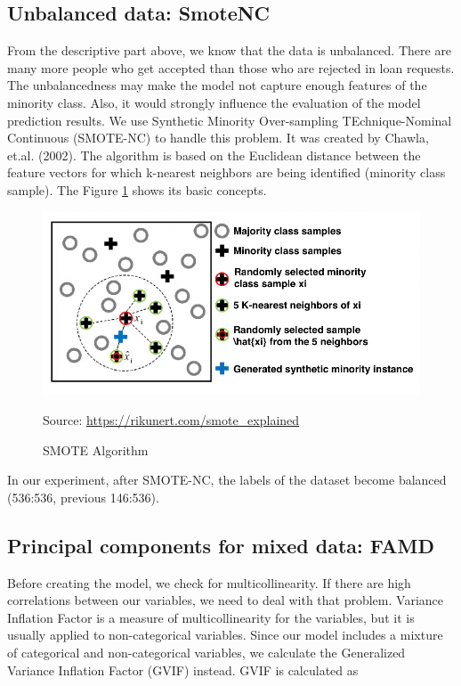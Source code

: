 \documentclass{jpp}
\begin{document}
\subsection{Unbalanced data: SmoteNC}

From the descriptive part above, we know that the data is unbalanced. There are many more people who get accepted than those who are rejected in loan requests. The unbalancedness may make the model not capture enough features of the minority class. Also, it would strongly influence the evaluation of the model prediction results. We use Synthetic Minority Over-sampling TEchnique-Nominal Continuous (SMOTE-NC) to handle this problem. It was created by Chawla, et.al. (2002). The algorithm is based on the Euclidean distance between the feature vectors for which k-nearest neighbors are being identified (minority class sample). The Figure \ref{smote} shows its basic concepts. 

\begin{figure}
  \centering
  \includegraphics[width=.9\linewidth]{smote.png}
    \caption*{Source: \url{https://rikunert.com/smote\_explained}
    }
  \caption{SMOTE Algorithm}
  \label{smote}
\end{figure}

In our experiment, after SMOTE-NC, the labels of the dataset become balanced (536:536, previous 146:536). 

\subsection{Principal components for mixed data: FAMD}

Before creating the model, we check for multicollinearity. If there are high correlations between our variables, we need to deal with that problem. Variance Inflation Factor is a measure of multicollinearity for the variables, but it is usually applied to non-categorical variables. Since our model includes a mixture of categorical and non-categorical variables, we calculate the Generalized Variance Inflation Factor (GVIF) instead. GVIF is calculated as
\end{document}
